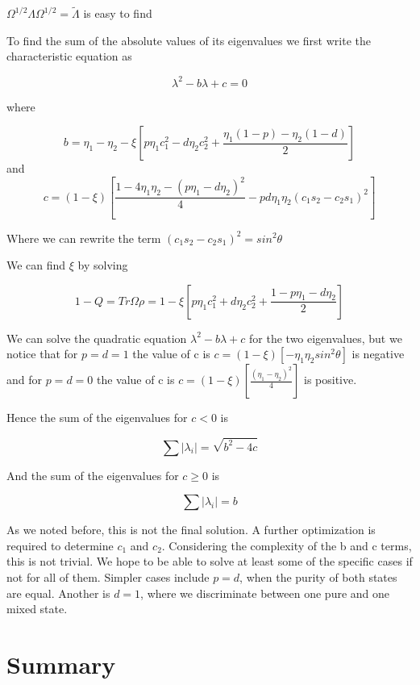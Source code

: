 \documentclass{beamer}
\newcommand{\abs}[1]{\left|{#1}\right|}
\newcommand{\td}[1]{\widetilde{#1}}
\begin{document}
\begin{frame}

$\Omega^{1/2}\Lambda \Omega^{1/2} = \td {\Lambda}$ is easy to find 

To find the sum of the absolute values of its eigenvalues we first write the characteristic equation as

\[ \lambda^2 - b \lambda + c = 0\]

where

\[b = \eta_1 -\eta_2 - \xi [ p\eta_1 c_1^2 - d\eta_2 c_2^2 + \frac{\eta_1(1-p) - \eta_2(1-d)}{2}]\]
and
\[c = (1-\xi)[ \frac{1- 4\eta_1\eta_2 -(p\eta_1 -d \eta_2)^2}{4} -pd \eta_1\eta_2 (c_1s_2-c_2s_1)^2]\]

Where we can rewrite the term $ (c_1s_2-c_2s_1)^2 = sin^2 \theta$ 
\end{frame}
\begin{frame}
We can find $\xi$ by solving


\[1-Q = Tr \Omega \rho = 1- \xi [ p\eta_1 c_1^2+ d\eta_2 c_2^2+ \frac{1-p\eta_1 -d\eta_2}{2}]\]

We can solve the quadratic equation $\lambda^2 -b \lambda +c$ for the two eigenvalues, but we notice that for $p=d=1$ the value of c is $c= (1-\xi)[-\eta_1\eta_2 sin^2 \theta]$ is negative and for $p=d=0$ the value of c is $c= (1-\xi)[\frac{(\eta_1-\eta_2)^2}{4}]$ is positive. 

 Hence the sum of the eigenvalues for $c<0$ is

\[\sum \abs {\lambda_i} = \sqrt{b^2-4c}\]

And the sum of the eigenvalues for $c \geq 0$ is

\[\sum \abs {\lambda_i} =b\]

\end{frame}
\begin{frame}
As we noted before, this is not the final solution.  A further optimization is required to determine $c_1$ and $c_2$.  Considering the complexity of the b and c terms, this is not trivial.  We hope to be able to solve at least some of the specific cases if not for all of them.  Simpler cases include $p=d$, when the purity of both states are equal.  Another is $d=1$, where we discriminate between one pure and one mixed state.
\end{frame}
\section*{Summary}
\end{document}
